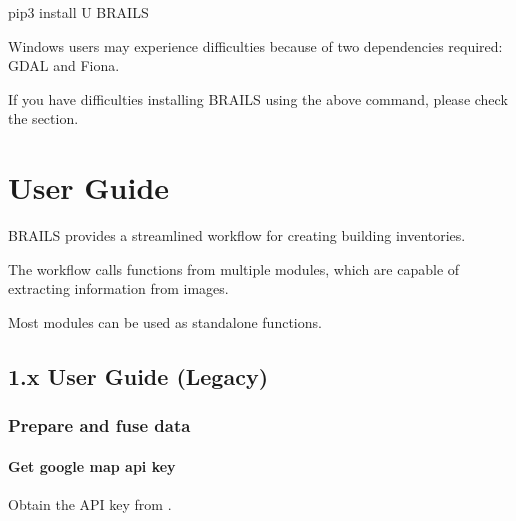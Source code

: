 \documentclass[letterpaper,10pt,english]{sphinxmanual}
\begin{document}
\begin{sphinxVerbatim}[commandchars=\\\{\}]
pip3 install \PYGZhy{}U BRAILS
\end{sphinxVerbatim}

\sphinxAtStartPar
Windows users may experience difficulties because of two dependencies required: GDAL and Fiona.

\sphinxAtStartPar
If you have difficulties installing BRAILS using the above command, please check the {\hyperref[\detokenize{common/user_manual/troubleshooting:lbltroubleshooting}]{}} section.


\section{User Guide}
\label{\detokenize{common/user_manual/userGuide:user-guide}}\label{\detokenize{common/user_manual/userGuide:lbl-tutorial}}\label{\detokenize{common/user_manual/userGuide::doc}}
\sphinxAtStartPar
BRAILS provides a streamlined workflow for creating building inventories.

\sphinxAtStartPar
The workflow calls functions from multiple modules, which are capable of extracting information from images.

\sphinxAtStartPar
Most modules can be used as standalone functions.


\subsection{1.x User Guide (Legacy)}
\label{\detokenize{common/user_manual/1.x:x-user-guide-legacy}}\label{\detokenize{common/user_manual/1.x:lbl-1-x-tutorial}}\label{\detokenize{common/user_manual/1.x::doc}}

\subsubsection{Prepare and fuse data}
\label{\detokenize{common/user_manual/preparedata:prepare-and-fuse-data}}\label{\detokenize{common/user_manual/preparedata:lbl-preparedata}}\label{\detokenize{common/user_manual/preparedata::doc}}

\paragraph{Get google map api key}
\label{\detokenize{common/user_manual/preparedata:get-google-map-api-key}}
\sphinxAtStartPar
Obtain the API key from .
\end{document}
